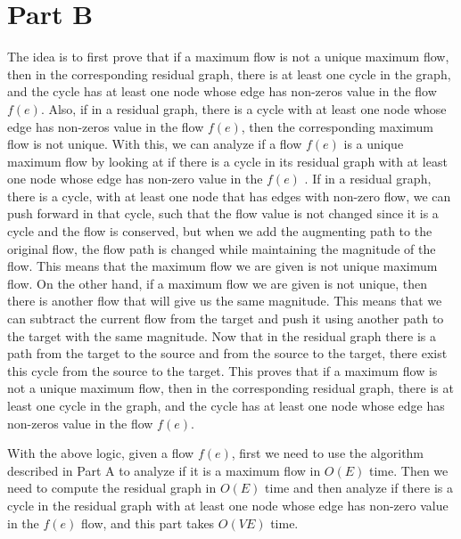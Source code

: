 \documentclass[11pt]{article}
\begin{document}
\section{Part B}
The idea is to first prove that if a maximum flow is not a unique maximum flow, then in the corresponding residual graph, there is at least one cycle in the graph, and the cycle has at least one node whose edge has non-zeros value in the flow $f(e)$. Also, if in a residual graph, there is a cycle with at least one node whose edge has non-zeros value in the flow $f(e)$, then the corresponding maximum flow is not unique. With this, we can analyze if a flow $f(e)$ is a unique maximum flow by looking at if there is a cycle in its residual graph with at least one node whose edge has non-zero value in the $f(e)$ .\newline
\noindent If in a residual graph, there is a cycle, with at least one node that has edges with non-zero flow, we can push forward in that cycle, such that the flow value is not changed since it is a cycle and the flow is conserved, but when we add the augmenting path to the original flow, the flow path is changed while maintaining the magnitude of the flow. This means that the maximum flow we are given is not unique maximum flow. 
\noindent  On the other hand, if a maximum flow we are given is not unique, then there is another flow that will give us the same magnitude. This means that we can subtract the current flow from the target and push it using another path to the target with the same magnitude. Now that in the residual graph there is a path from the target to the source and from the source to the target, there exist this cycle from the source to the target. This proves that if a maximum flow is not a unique maximum flow, then in the corresponding residual graph, there is at least one cycle in the graph, and the cycle has at least one node whose edge has non-zeros value in the flow $f(e)$.


\noindent With the above logic, given a flow $f(e)$, first we need to use the algorithm described in Part A to analyze if it is a maximum flow in $O(E)$ time. Then we need to compute the residual graph in $O(E)$ time and then analyze if there is a cycle in the residual graph with at least one node whose edge has non-zero value in the $f(e)$ flow, and this part takes $O(VE)$ time. 
\end{document}

